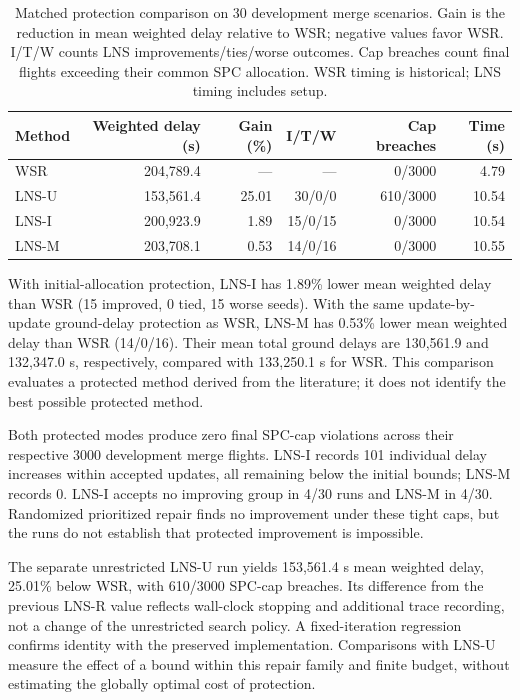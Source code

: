 \begin{table}[!htbp]
\centering\small
\caption{Matched protection comparison on 30 development merge scenarios. Gain is the reduction in mean weighted delay relative to WSR; negative values favor WSR. I/T/W counts LNS improvements/ties/worse outcomes. Cap breaches count final flights exceeding their common SPC allocation. WSR timing is historical; LNS timing includes setup.}\label{tab:protected-main}
\begin{tabular}{lrrrrr}
\toprule
Method & Weighted delay (s) & Gain (\%) & I/T/W & Cap breaches & Time (s)\\
\midrule
WSR & 204,789.4 & --- & --- & 0/3000 & 4.79\\
LNS-U & 153,561.4 & 25.01 & 30/0/0 & 610/3000 & 10.54\\
LNS-I & 200,923.9 & 1.89 & 15/0/15 & 0/3000 & 10.54\\
LNS-M & 203,708.1 & 0.53 & 14/0/16 & 0/3000 & 10.55\\
\bottomrule
\end{tabular}
\end{table}

With initial-allocation protection, LNS-I has 1.89\% lower mean weighted delay than WSR (15 improved, 0 tied, 15 worse seeds). With the same update-by-update ground-delay protection as WSR, LNS-M has 0.53\% lower mean weighted delay than WSR (14/0/16). Their mean total ground delays are 130,561.9 and 132,347.0 s, respectively, compared with 133,250.1 s for WSR. This comparison evaluates a protected method derived from the literature; it does not identify the best possible protected method.

Both protected modes produce zero final SPC-cap violations across their respective 3000 development merge flights. LNS-I records 101 individual delay increases within accepted updates, all remaining below the initial bounds; LNS-M records 0. LNS-I accepts no improving group in 4/30 runs and LNS-M in 4/30. Randomized prioritized repair finds no improvement under these tight caps, but the runs do not establish that protected improvement is impossible.

The separate unrestricted LNS-U run yields 153,561.4 s mean weighted delay, 25.01\% below WSR, with 610/3000 SPC-cap breaches. Its difference from the previous LNS-R value reflects wall-clock stopping and additional trace recording, not a change of the unrestricted search policy. A fixed-iteration regression confirms identity with the preserved implementation. Comparisons with LNS-U measure the effect of a bound within this repair family and finite budget, without estimating the globally optimal cost of protection.

